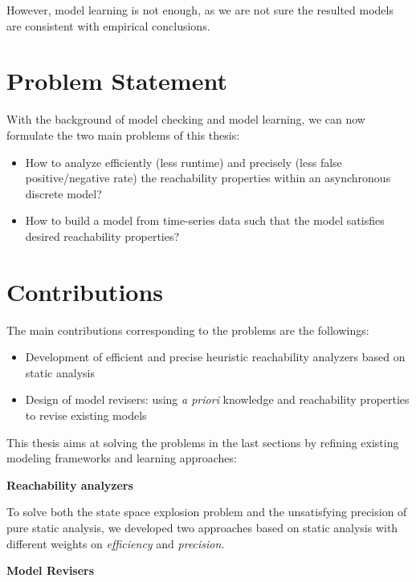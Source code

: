 However, model learning is not enough, as we are not sure the resulted models are consistent with empirical conclusions.

\section{Problem Statement}\label{sec:problemStatement}

With the background of model checking and model learning, we can now formulate the two main problems of this thesis:
\begin{itemize}
    \item How to analyze efficiently (less runtime) and precisely (less false positive/negative rate) the reachability properties within an asynchronous discrete model?
    
    \item How to build a model from time-series data such that the model satisfies desired reachability properties?
    
    
\end{itemize}



\section{Contributions}\label{sec:contribution}
The main contributions corresponding to the problems are the followings:
\begin{itemize}
    \item Development of efficient and precise heuristic reachability analyzers based on static analysis
    \item Design of model revisers: using \textit{a priori} knowledge and reachability properties to revise existing models
\end{itemize}

This thesis aims at solving the problems in the last sections by refining existing modeling frameworks and learning approaches:

\textbf{Reachability analyzers}

To solve both the state space explosion problem and the unsatisfying precision of pure static analysis, we developed two approaches based on static analysis with different weights on \textit{efficiency} and \textit{precision}.

\textbf{Model Revisers}

